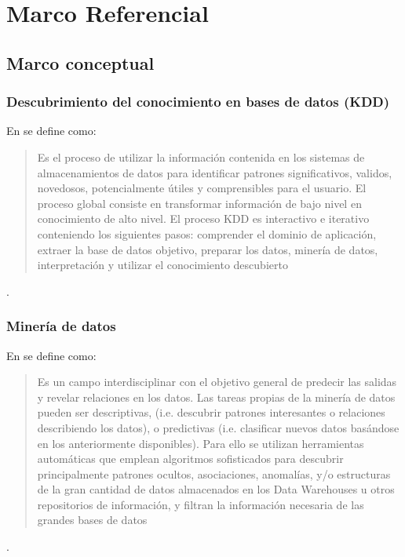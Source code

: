 \chapter{Marco Referencial}
\section{Marco conceptual}
\subsection{Descubrimiento del conocimiento en bases de datos (KDD)}
En \cite{key-60} se define como: \begin{quote} Es el proceso de utilizar la información contenida en los sistemas de almacenamientos de datos para identificar patrones significativos, validos, novedosos, potencialmente útiles y comprensibles para el usuario. El proceso global consiste en transformar información de bajo nivel en conocimiento de alto nivel. El proceso KDD es interactivo e iterativo conteniendo los siguientes pasos: comprender el dominio de aplicación, extraer la base de datos objetivo, preparar los datos, minería de datos, interpretación y utilizar el conocimiento descubierto \end{quote}.
\subsection{Minería de datos}
En \cite{key-60} se define como: \begin{quote} Es un campo interdisciplinar con el objetivo general de predecir las salidas y revelar relaciones en los datos. Las tareas propias de la minería de datos pueden ser descriptivas, (i.e. descubrir patrones interesantes o relaciones describiendo los datos), o predictivas (i.e. clasificar nuevos datos basándose en los anteriormente disponibles). Para ello se utilizan herramientas automáticas que emplean algoritmos sofisticados para descubrir principalmente patrones ocultos, asociaciones, anomalías, y/o estructuras de la gran cantidad de datos almacenados en los Data Warehouses u otros repositorios de información, y filtran la información necesaria de las grandes bases de datos \end{quote}.
